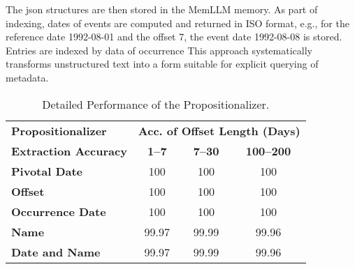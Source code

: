\documentclass[11pt]{article}
\begin{document}
The json structures are then stored in the MemLLM memory. As
part of indexing, dates of events are computed and returned
in ISO format, e.g., for the reference date 1992-08-01 and the offset
7, the event date 1992-08-08 is stored.
Entries are indexed by data of occurrence
This approach systematically transforms
unstructured text into a form suitable for 
explicit querying of metadata.








\begin{table}[ht]
\centering
\caption{Detailed Performance of the Propositionalizer.}
\label{tab:propositionalizer}
\begin{tabular}{l|ccc}
\hline
\textbf{Propositionalizer} & \multicolumn{3}{c}{\small{\textbf{Acc. of Offset Length (Days)}}} \\
\cline{2-4}
\small{\textbf{Extraction Accuracy}}  & \textbf{1--7 }  & \textbf{7--30 } & \textbf{100--200 } \\
\hline
\textbf{Pivotal Date} & 100 & 100 & 100 \\
\textbf{Offset} & 100 & 100 & 100 \\
\textbf{Occurrence Date} & 100 & 100 & 100 \\
\textbf{Name} & 99.97 & 99.99 & 99.96 \\
\textbf{Date and Name} & 99.97 & 99.99 & 99.96 \\
\hline
\end{tabular}
\end{table}
\end{document}
